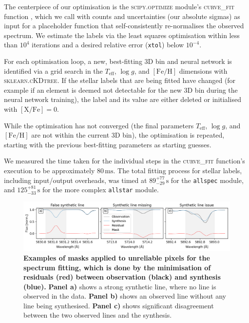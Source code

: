 \documentclass[
  journal=pasa,
  manuscript=research-paper, %
  year=2024,
  volume=37
]{cup-journal}
\newcommand{\Teff}{$T_\mathrm{eff}$\xspace}
\newcommand{\logg}{$\log g$\xspace}
\newcommand{\feh}{$\mathrm{[Fe/H]}$\xspace}
\newcommand{\TLF}{\Teff, \logg, and \feh}
\begin{document}
The centerpiece of our optimisation is the \textsc{scipy.optimize} module's \textsc{curve\_fit} function \citep{scipy}, which we call with counts and uncertainties (our absolute sigmas) as input for a placeholder function that self-consistently re-normalises the observed spectrum. We estimate the labels via the least squares optimisation within less than $10^4$ iterations and a desired relative error (\texttt{xtol}) below $10^{-4}$.

For each optimisation loop, a new, best-fitting 3D bin and neural network is identified via a grid search in the \TLF dimensions with \textsc{sklearn.cKDtree}. If the stellar labels that are being fitted have changed (for example if an element is deemed not detectable for the new 3D bin during the neural network training), the label and its value are either deleted or initialised with $\mathrm{[X/Fe]} = 0$.

While the optimisation has not converged (the final parameters \TLF are not within the current 3D bin), the optimisation is repeated, starting with the previous best-fitting parameters as starting guesses.

We measured the time taken for the individual steps in the \textsc{curve\_fit} function's execution to be approximately $80\,\mathrm{ms}$. The total fitting process for stellar labels, including input/output overheads, was timed at $89_{-29}^{+77}\,\mathrm{s}$ for the \texttt{allspec} module, and $125_{-33}^{+81}\,\mathrm{s}$ for the more complex \texttt{allstar} module.

\begin{figure}[ht]
\centering  
\includegraphics[width=\textwidth]{figures/example_masking_sun.png}
\caption{\textbf{Examples of masks applied to unreliable pixels for the spectrum fitting, which is done by the minimisation of residuals (red) between observation (black) and synthesis (blue).} \textbf{Panel a)} shows a strong synthetic line, where no line is observed in the data. \textbf{Panel b)} shows an observed line without any line being synthesised. \textbf{Panel c)} shows significant disagreement between the two observed lines and the synthesis.} \label{fig:example_masking_sun}
\end{figure}
\end{document}
